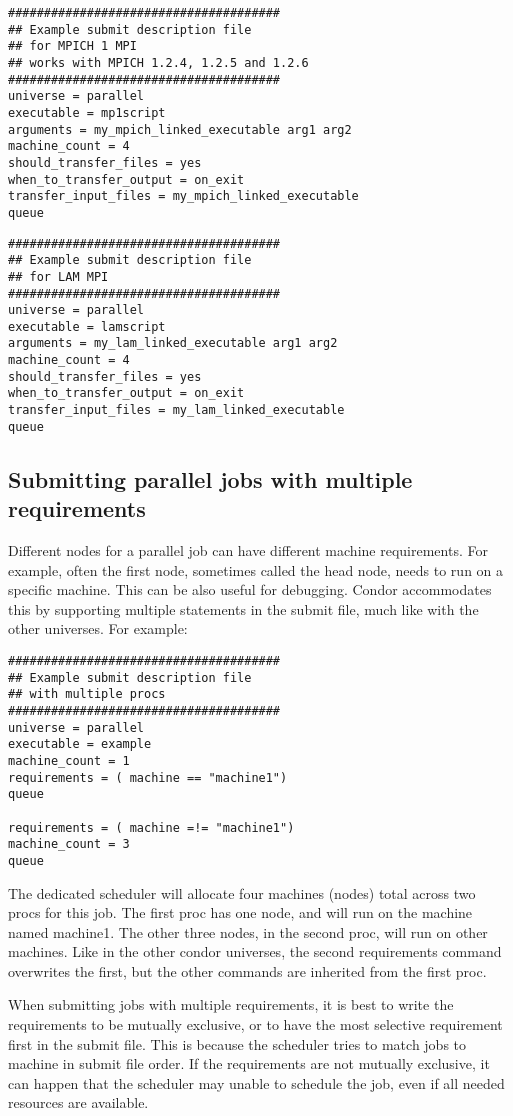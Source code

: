 \begin{verbatim}
######################################
## Example submit description file
## for MPICH 1 MPI
## works with MPICH 1.2.4, 1.2.5 and 1.2.6
######################################
universe = parallel
executable = mp1script
arguments = my_mpich_linked_executable arg1 arg2
machine_count = 4
should_transfer_files = yes
when_to_transfer_output = on_exit
transfer_input_files = my_mpich_linked_executable
queue
\end{verbatim}

\begin{verbatim}
######################################
## Example submit description file
## for LAM MPI
######################################
universe = parallel
executable = lamscript
arguments = my_lam_linked_executable arg1 arg2
machine_count = 4
should_transfer_files = yes
when_to_transfer_output = on_exit
transfer_input_files = my_lam_linked_executable
queue
\end{verbatim}

\subsection{\label{sec:parallel-multi-proc}Submitting parallel jobs with multiple requirements}
Different nodes for a parallel job can have different machine
requirements.  For example, often the first node, sometimes called the
head node, needs to run on a specific machine.  This can be also
useful for debugging.  Condor accommodates this by supporting multiple
 statements in the submit file, much like with the other
universes.  For example:

\begin{verbatim}
######################################
## Example submit description file
## with multiple procs
######################################
universe = parallel
executable = example
machine_count = 1
requirements = ( machine == "machine1")
queue

requirements = ( machine =!= "machine1")
machine_count = 3
queue
\end{verbatim}

The dedicated scheduler will allocate four machines (nodes) total across
two procs for this job.  The first proc has one node,
 and will run on the machine named machine1.  The 
other three nodes, in the second proc, will run on other machines.  
Like in the other condor universes, the second requirements command 
overwrites the first, but the other commands are inherited from the 
first proc.

When submitting jobs with multiple requirements, it is
best to write the requirements to be mutually exclusive,
or to have the most selective requirement first in the submit file.
This is because the scheduler tries to match jobs to machine in
submit file order.  If the requirements are not mutually exclusive,
it can happen that the scheduler may unable to schedule the job, even
if all needed resources are available.



